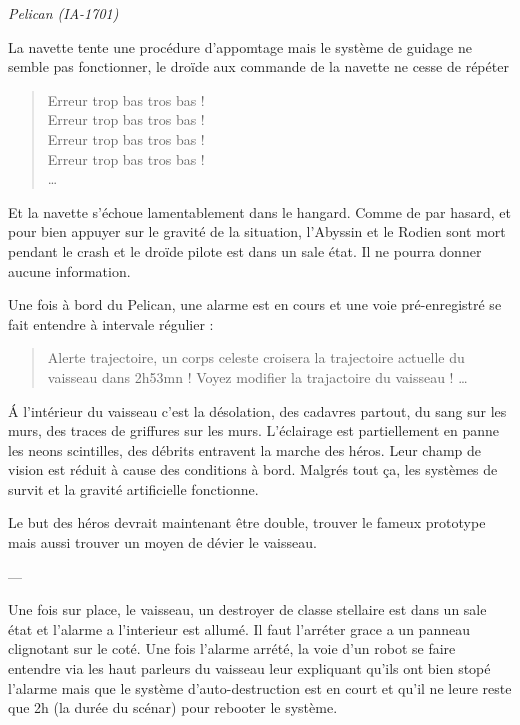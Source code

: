 \documentclass{jdrp}
\begin{document}
\begin{flushright}
	\emph{Pelican (IA-1701)}
\end{flushright}

\vspace{5\baselineskip}
La navette tente une procédure d'appomtage mais le système de guidage ne semble pas fonctionner, le droïde aux commande de la navette ne cesse de répéter 

\begin{quote}
	Erreur trop bas tros bas !\\
	Erreur trop bas tros bas !\\
	Erreur trop bas tros bas !\\
	Erreur trop bas tros bas !\\
	\ldots
\end{quote}

Et la navette s'échoue lamentablement dans le hangard. Comme de par hasard, et pour bien appuyer sur le gravité de la situation, l'Abyssin et le Rodien sont mort pendant le crash et le droïde pilote est dans un sale état. Il ne pourra donner aucune information.

Une fois à bord du Pelican, une alarme est en cours et une voie pré-enregistré se fait entendre à intervale régulier :

\begin{quote}
	Alerte trajectoire, un corps celeste croisera la trajectoire actuelle du vaisseau dans 2h53mn ! Voyez modifier la trajactoire du vaisseau !
	\ldots
\end{quote}

\'A l'intérieur du vaisseau c'est la désolation, des cadavres partout, du sang sur les murs, des traces de griffures sur les murs. L'éclairage est partiellement en panne les neons scintilles, des débrits entravent la marche des héros. Leur champ de vision est réduit à cause des conditions à bord. Malgrés tout ça, les systèmes de survit et la gravité artificielle fonctionne.

Le but des héros devrait maintenant être double, trouver le fameux prototype mais aussi trouver un moyen de dévier le vaisseau.


---


Une fois sur place, le vaisseau, un destroyer de classe stellaire est dans un sale état et l'alarme a l'interieur est allumé. Il faut l'arréter grace a un panneau clignotant sur le coté. Une fois l'alarme arrété, la voie d'un robot se faire entendre via les haut parleurs du vaisseau leur expliquant qu'ils ont bien stopé l'alarme mais que le système d'auto-destruction est en court et qu'il ne leure reste que 2h (la durée du scénar) pour rebooter le système.
\end{document}
